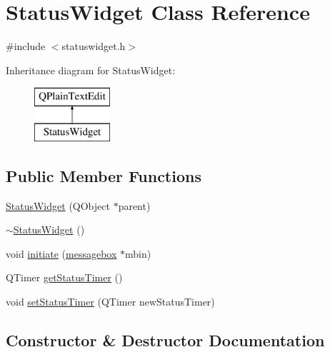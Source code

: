 \hypertarget{class_status_widget}{}\section{Status\+Widget Class Reference}
\label{class_status_widget}


{\ttfamily \#include $<$statuswidget.\+h$>$}

Inheritance diagram for Status\+Widget\+:\begin{figure}[H]
\begin{center}
\leavevmode
\includegraphics[height=2.000000cm]{class_status_widget}
\end{center}
\end{figure}
\subsection*{Public Member Functions}
\begin{DoxyCompactItemize}
\item 
\hyperlink{class_status_widget_a64fbad1ba9c9e7584afc4eae42521878}{Status\+Widget} (Q\+Object $\ast$parent)
\item 
\hyperlink{class_status_widget_a0991157916d0e53285dd00ff27f4a1c5}{$\sim$\+Status\+Widget} ()
\item 
void \hyperlink{class_status_widget_ab4adf6771aca52d05c164e97fa8d06f5}{initiate} (\hyperlink{classmessagebox}{messagebox} $\ast$mbin)
\item 
Q\+Timer \hyperlink{class_status_widget_a43ed1589a2b314c7f6fcef0b71116244}{get\+Status\+Timer} ()
\item 
void \hyperlink{class_status_widget_a172ab7eb7040df2efa0eef942f90e5b0}{set\+Status\+Timer} (Q\+Timer new\+Status\+Timer)
\end{DoxyCompactItemize}


\subsection{Constructor \& Destructor Documentation}
\hypertarget{class_status_widget_a64fbad1ba9c9e7584afc4eae42521878}{}
